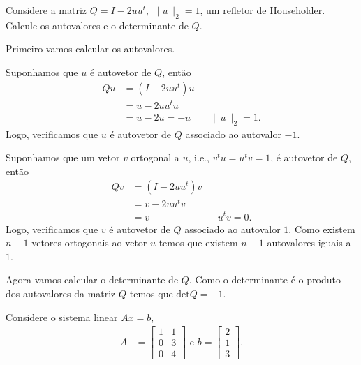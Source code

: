 \documentclass[a4paper,12pt, leqno, answers]{exam}
\begin{document}
\begin{questions}
    \question Considere a matriz $Q = I - 2 u u^t$, $\| u \|_2 = 1$, um refletor de Householder. Calcule os autovalores e o determinante de $Q$.
    \begin{solution}
       Primeiro vamos calcular os autovalores.

       Suponhamos que $u$ \'{e} autovetor de $Q$, ent\~{a}o
       \begin{align*}
           Q u &= \left( I - 2 u u^t \right) u \\
           &= u - 2 u u^t u \\
           &= u - 2 u = -u && \| u \|_2 = 1.
       \end{align*}
       Logo, verificamos que $u$ \'{e} autovetor de $Q$ associado ao autovalor $-1$.

       Suponhamos que um vetor $v$ ortogonal a $u$, i.e., $v^t u = u^t v = 1$, \'{e} autovetor de $Q$, ent\~{a}o
       \begin{align*}
           Q v &= \left( I - 2 u u^t \right) v \\
           &= v - 2 u u^t v \\
           &= v && u^t v = 0.
       \end{align*}
       Logo, verificamos que $v$ \'{e} autovetor de $Q$ associado ao autovalor $1$. Como existem $n - 1$ vetores ortogonais ao vetor $u$ temos que existem $n - 1$ autovalores iguais a $1$.

       Agora vamos calcular o determinante de $Q$. Como o determinante \'{e} o produto dos autovalores da matriz $Q$ temos que $\text{det}{Q} = -1$.
    \end{solution}

    \question Considere o sistema linear $A x = b$,
    \begin{align*}
        A &= \begin{bmatrix}
            1 & 1 \\
            0 & 3 \\
            0 & 4
        \end{bmatrix} \text{ e } b = \begin{bmatrix}
            2 \\
            1 \\
            3
        \end{bmatrix}.
    \end{align*}
\end{questions}
\end{document}
